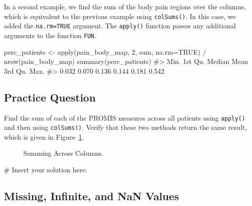 \documentclass[
  letterpaper,
]{latex/krantz}
\makeatletter
\newenvironment{Shaded}{\begin{snugshade}}{\end{snugshade}}
\newcommand{\AttributeTok}[1]{\textcolor[rgb]{0.40,0.45,0.13}{#1}}
\newcommand{\CommentTok}[1]{\textcolor[rgb]{0.37,0.37,0.37}{#1}}
\newcommand{\ConstantTok}[1]{\textcolor[rgb]{0.56,0.35,0.01}{#1}}
\newcommand{\DecValTok}[1]{\textcolor[rgb]{0.68,0.00,0.00}{#1}}
\newcommand{\FunctionTok}[1]{\textcolor[rgb]{0.28,0.35,0.67}{#1}}
\newcommand{\NormalTok}[1]{\textcolor[rgb]{0.00,0.23,0.31}{#1}}
\newcommand{\OtherTok}[1]{\textcolor[rgb]{0.00,0.23,0.31}{#1}}
\newcommand{\SpecialCharTok}[1]{\textcolor[rgb]{0.37,0.37,0.37}{#1}}
\newenvironment{kframe}{%
\medskip{}
\setlength{\fboxsep}{.8em}
 \def\at@end@of@kframe{}%
 \ifinner\ifhmode%
  \def\at@end@of@kframe{\end{minipage}}%
  \begin{minipage}{\columnwidth}%
 \fi\fi%
 \def\FrameCommand##1{\hskip\@totalleftmargin \hskip-\fboxsep
 \colorbox{shadecolor}{##1}\hskip-\fboxsep
     \hskip-\linewidth \hskip-\@totalleftmargin \hskip\columnwidth}%
 \MakeFramed {\advance\hsize-\width
   \@totalleftmargin\z@ \linewidth\hsize
   \@setminipage}}%
 {\par\unskip\endMakeFramed%
 \at@end@of@kframe}
\renewenvironment{Shaded}{\begin{kframe}}{\end{kframe}}
\makeatother
\begin{document}
In a second example, we find the sum of the body pain regions over the
columns, which is equivalent to the previous example using
\texttt{colSums()}. In this case, we added the \texttt{na.rm=TRUE}
argument. The \texttt{apply()} function passes any additional arguments
to the function \texttt{FUN}.

\begin{Shaded}
\begin{Highlighting}[]
\NormalTok{perc\_patients }\OtherTok{\textless{}{-}} \FunctionTok{apply}\NormalTok{(pain\_body\_map, }\DecValTok{2}\NormalTok{, sum, }\AttributeTok{na.rm=}\ConstantTok{TRUE}\NormalTok{) }\SpecialCharTok{/}
  \FunctionTok{nrow}\NormalTok{(pain\_body\_map)}
\FunctionTok{summary}\NormalTok{(perc\_patients)}
\CommentTok{\#\textgreater{}    Min. 1st Qu.  Median    Mean 3rd Qu.    Max. }
\CommentTok{\#\textgreater{}   0.032   0.070   0.136   0.144   0.181   0.542}
\end{Highlighting}
\end{Shaded}

\subsection{Practice Question}\label{practice-question-4}

Find the sum of each of the PROMIS measures across all patients using
\texttt{apply()} and then using \texttt{colSums()}. Verify that these
two methods return the same result, which is given in
Figure~\ref{fig-promis-col-sums}.

\begin{figure}


\caption{\label{fig-promis-col-sums}Summing Across Columns.}

\end{figure}%

\begin{Shaded}
\begin{Highlighting}[]
\CommentTok{\# Insert your solution here:}
\end{Highlighting}
\end{Shaded}

\subsection{\texorpdfstring{Missing, Infinite, and NaN Values
  
}{Missing, Infinite, and NaN Values    }}\label{missing-infinite-and-nan-values}
\end{document}
